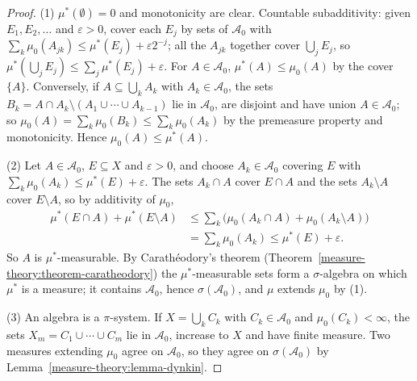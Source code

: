 \begin{proof}
(1) $\mu^*(\emptyset) = 0$ and monotonicity are clear. Countable subadditivity: given $E_1, E_2, \ldots$ and $\varepsilon > 0$, cover each $E_j$ by sets of $\mathcal{A}_0$ with
$\sum_k\mu_0(A_{jk}) \leq \mu^*(E_j) + \varepsilon2^{-j}$; all the $A_{jk}$ together cover $\bigcup_jE_j$, so $\mu^*(\bigcup_jE_j) \leq \sum_j\mu^*(E_j) + \varepsilon$. For $A \in \mathcal{A}_0$,
$\mu^*(A) \leq \mu_0(A)$ by the cover $\{A\}$. Conversely, if $A \subseteq \bigcup_kA_k$ with $A_k \in \mathcal{A}_0$, the sets $B_k = A \cap A_k \setminus (A_1 \cup \cdots \cup A_{k-1})$ lie in
$\mathcal{A}_0$, are disjoint and have union $A \in \mathcal{A}_0$; so $\mu_0(A) = \sum_k\mu_0(B_k) \leq \sum_k\mu_0(A_k)$ by the premeasure property and monotonicity. Hence
$\mu_0(A) \leq \mu^*(A)$.

(2) Let $A \in \mathcal{A}_0$, $E \subseteq X$ and $\varepsilon > 0$, and choose $A_k \in \mathcal{A}_0$ covering $E$ with $\sum_k\mu_0(A_k) \leq \mu^*(E) + \varepsilon$. The sets $A_k \cap A$ cover
$E \cap A$ and the sets $A_k \setminus A$ cover $E \setminus A$, so by additivity of $\mu_0$,
\[\begin{aligned}
\mu^*(E \cap A) + \mu^*(E \setminus A) &\leq \sum_k\bigl(\mu_0(A_k \cap A) + \mu_0(A_k \setminus A)\bigr) \\
&= \sum_k\mu_0(A_k) \leq \mu^*(E) + \varepsilon .
\end{aligned}\]
So $A$ is $\mu^*$-measurable. By Carath\'eodory's theorem (Theorem~\ref{measure-theory:theorem-caratheodory}) the $\mu^*$-measurable sets form a $\sigma$-algebra on which $\mu^*$ is a measure; it
contains $\mathcal{A}_0$, hence $\sigma(\mathcal{A}_0)$, and $\mu$ extends $\mu_0$ by (1).

(3) An algebra is a $\pi$-system. If $X = \bigcup_kC_k$ with $C_k \in \mathcal{A}_0$ and $\mu_0(C_k) < \infty$, the sets $X_m = C_1 \cup \cdots \cup C_m$ lie in $\mathcal{A}_0$, increase to $X$
and have finite measure. Two measures extending $\mu_0$ agree on $\mathcal{A}_0$, so they agree on $\sigma(\mathcal{A}_0)$ by Lemma~\ref{measure-theory:lemma-dynkin}.
\end{proof}

